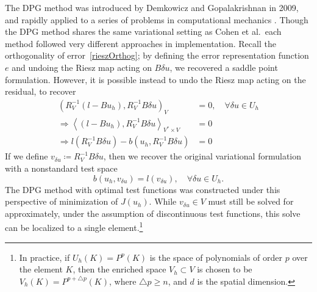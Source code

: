 \documentclass[final,leqno]{siamltex}
\newcommand{\LRp}[1]{\left( #1 \right)}
\newcommand{\LRa}[1]{\left\langle #1 \right\rangle}
\begin{document}
The DPG method was introduced by Demkowicz and Gopalakrishnan in 2009, and rapidly applied to a series of problems in computational mechanics \cite{DPG2,DPG3,DPG4,maxwellDPG,stokesDPG}.  Though the DPG method shares the same variational setting as Cohen et al.\, each method followed very different approaches in implementation.  Recall the orthogonality of error~\eqref{rieszOrthog}; by defining the error representation function $e$ and undoing the Riesz map acting on $B\delta u$, we recovered a saddle point formulation.  However, it is possible instead to undo the Riesz map acting on the residual, to recover
\begin{align*}
\LRp{R_V^{-1}\LRp{l-Bu_h},R_V^{-1}B\delta u}_V &= 0, \quad \forall \delta u \in U_h\\
\Rightarrow \LRa{\LRp{l-Bu_h},R_V^{-1}B\delta u}_{V^*\times V} &= 0\\
\Rightarrow l\LRp{R_V^{-1}B\delta u}-b\LRp{u_h,R_V^{-1}B\delta u} &= 0
\end{align*}
If we define $v_{\delta u} \coloneqq R_V^{-1}B\delta u$, then we recover the original variational formulation with a nonstandard test space
\[
b(u_h,v_{\delta u}) = l(v_{\delta u}), \quad \forall \delta u \in U_h.
\]
The DPG method with optimal test functions was constructed under this perspective of minimization of $J(u_h)$.  While $v_{\delta u} \in V$ must still be solved for approximately, under the assumption of discontinuous test functions, this solve can be localized to a single element.\footnote{In practice, if $U_h(K) = P^p(K)$ is the space of polynomials of order $p$ over the element $K$, then the enriched space $V_h \subset V$ is chosen to be $V_h(K) = P^{p+\triangle p}(K)$, where $\triangle p \geq n$, and $d$ is the spatial dimension.}
\end{document}
